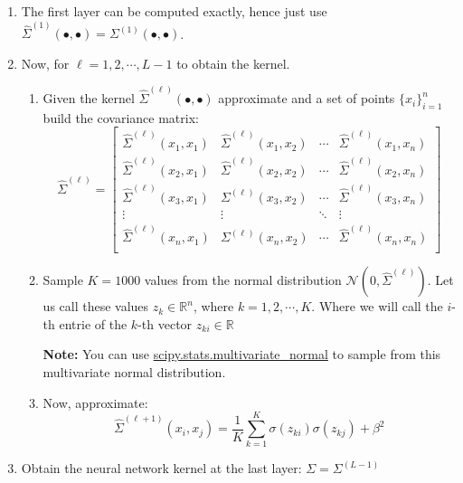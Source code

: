 \documentclass[a4paper,10pt]{article}
\newcommand{\R}{\mathbb{R}}
\newenvironment{note}
{
\begin{center}
\begin{lrbox}{\mybox}
\begin{minipage}{42em}}
{\end{minipage}
\end{lrbox}\fbox{\usebox{\mybox}}
\end{center}}
\begin{document}
\begin{enumerate}
    \item The first layer can be computed exactly, hence just use $\hat{\Sigma}^{(1)} (\bullet, \bullet) = \Sigma^{(1)}\left(\bullet, \bullet\right)$.
    \item Now, for $\ell = 1, 2, \cdots, L-1$ to obtain the kernel.
    \begin{enumerate}
    \item Given the kernel $\hat{\Sigma}^{(\ell)} (\bullet, \bullet)$ approximate and a set of points $\{x_i\}_{i = 1}^n$ build the covariance matrix:
    \begin{equation}
       \hat{\Sigma}^{(\ell)} =
       \begin{bmatrix}
    \hat{\Sigma}^{(\ell)}(x_1, x_1) & \hat{\Sigma}^{(\ell)}(x_1, x_2) & \cdots & \hat{\Sigma}^{(\ell)}(x_1, x_n)\\
    \hat{\Sigma}^{(\ell)}(x_2, x_1) & \hat{\Sigma}^{(\ell)}(x_2, x_2) & \cdots & \hat{\Sigma}^{(\ell)}(x_2, x_n)\\
    \hat{\Sigma}^{(\ell)}(x_3, x_1) & \Sigma^{(\ell)}(x_3, x_2) & \cdots & \hat{\Sigma}^{(\ell)}(x_3, x_n)\\
    \vdots & \vdots & \ddots & \vdots\\
    \hat{\Sigma}^{(\ell)}(x_n, x_1) & \Sigma^{(\ell)}(x_n, x_2) & \cdots & \hat{\Sigma}^{(\ell)}(x_n, x_n)\\
    \end{bmatrix}
    \end{equation}
    \item Sample $K = 1000$ values from the normal distribution $\mathcal{N}\left(0,\hat{\Sigma}^{(\ell)}\right)$. Let us call these values $z_k \in \R^n$, where $k = 1, 2,\cdots, K$. Where we will call the $i$-th entrie of the $k$-th vector  $z_{ki} \in \R$
    \begin{note}
    \textbf{Note:} You can use \href{https://docs.scipy.org/doc/scipy/reference/generated/scipy.stats.multivariate_normal.html}{scipy.stats.multivariate\_normal} to sample from this multivariate normal distribution.
    \end{note}
    \item Now, approximate:
    \begin{equation}
    \hat{\Sigma}^{(\ell+1)}\left(x_i, x_j\right) = \frac{1}{K} \sum_{k=1}^K \sigma(z_{ki})  \sigma(z_{kj}) + \beta^2
    \end{equation}
    \end{enumerate}
    \item Obtain the neural network kernel at the last layer: $\Sigma = \Sigma^{(L-1)}$
\end{enumerate}
\end{document}
